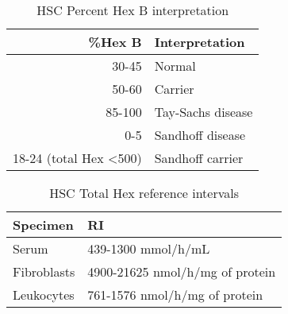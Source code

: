 \documentclass[12pt]{scrartcl}
\begin{document}
\begin{table}[htbp]
\caption{\label{tab:org0b26dca}HSC Percent Hex B interpretation}
\centering
\begin{tabular}{rl}
\%Hex B & Interpretation\\
\hline
30-45 & Normal\\
50-60 & Carrier\\
85-100 & Tay-Sachs disease\\
0-5 & Sandhoff disease\\
18-24 (total Hex <500) & Sandhoff carrier\\
\end{tabular}
\end{table}


\begin{table}[htbp]
\caption{\label{tab:org649e84c}HSC Total Hex reference intervals}
\centering
\begin{tabular}{ll}
Specimen & RI\\
\hline
Serum & 439-1300 mmol/h/mL\\
Fibroblasts & 4900-21625 nmol/h/mg of protein\\
Leukocytes & 761-1576 nmol/h/mg of protein\\
\end{tabular}
\end{table}
\end{document}
